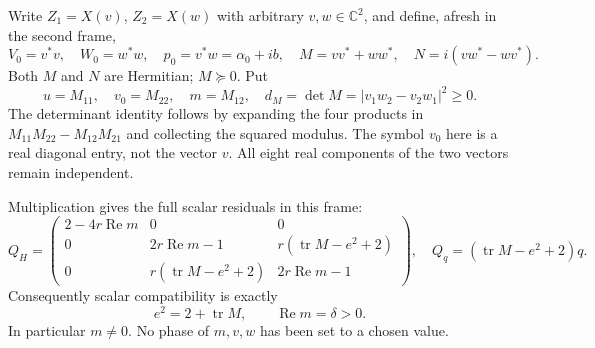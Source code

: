 Write $Z_1=X(v)$, $Z_2=X(w)$ with arbitrary $v,w\in\mathbb C^2$,
and define, afresh in the second frame,
\[
V_0=v^*v,\quad W_0=w^*w,\quad p_0=v^*w=\alpha_0+ib,
\quad M=vv^*+ww^*,\quad N=i(vw^*-wv^*).
\]
Both $M$ and $N$ are Hermitian; $M\succeq0$. Put
\[
u=M_{11},\quad v_0=M_{22},\quad m=M_{12},\quad
d_M=\det M=|v_1w_2-v_2w_1|^2\ge0.
\]
The determinant identity follows by expanding the four products in
$M_{11}M_{22}-M_{12}M_{21}$ and collecting the squared modulus.
The symbol $v_0$ here is a real diagonal entry, not the vector $v$.
All eight real components of the two vectors remain independent.

Multiplication gives the full scalar residuals in this frame:
\[
Q_H=\begin{pmatrix}
2-4r\operatorname{Re}m&0&0\\
0&2r\operatorname{Re}m-1&r(\operatorname{tr}M-e^2+2)\\
0&r(\operatorname{tr}M-e^2+2)&2r\operatorname{Re}m-1
\end{pmatrix},
\quad Q_q=(\operatorname{tr}M-e^2+2)q.
\]
Consequently scalar compatibility is exactly
\begin{equation}
e^2=2+\operatorname{tr}M,\qquad \operatorname{Re}m=\delta>0.
\label{q444:twocross:eq:second-scalar}
\end{equation}
In particular $m\ne0$. No phase of $m,v,w$ has been set to a chosen value.

